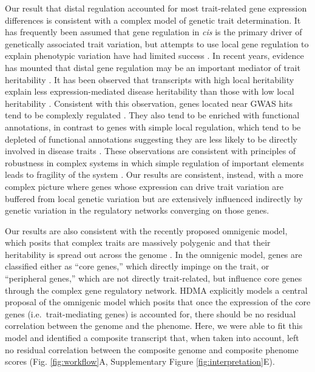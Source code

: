 \documentclass[
]{article}
\begin{document}
Our result that distal regulation accounted for most trait-related gene
expression differences is consistent with a complex model of genetic
trait determination. It has frequently been assumed that gene regulation
in \textit{cis} is the primary driver of genetically associated trait
variation, but attempts to use local gene regulation to explain
phenotypic variation have had limited success
\cite{pmid32912663, pmid36515579}. In recent years, evidence has mounted
that distal gene regulation may be an important mediator of trait
heritability \cite{pmid32424349, 
pmid37857933, pmid31051098, pmid34475573}. It has been observed that
transcripts with high local heritability explain less
expression-mediated disease heritability than those with low local
heritability \cite{pmid32424349}. Consistent with this observation,
genes located near GWAS hits tend to be complexly regulated
\cite{pmid37857933}. They also tend to be enriched with functional
annotations, in contrast to genes with simple local regulation, which
tend to be depleted of functional annotations suggesting they are less
likely to be directly involved in disease traits \cite{pmid37857933}.
These observations are consistent with principles of robustness in
complex systems in which simple regulation of important elements leads
to fragility of the system
\cite{pmid29782925, pmid12082173, pmid27304973}. Our results are
consistent, instead, with a more complex picture where genes whose
expression can drive trait variation are buffered from local genetic
variation but are extensively influenced indirectly by genetic variation
in the regulatory networks converging on those genes.

Our results are also consistent with the recently proposed omnigenic
model, which posits that complex traits are massively polygenic and that
their heritability is spread out across the genome \cite{pmid28622505}.
In the omnigenic model, genes are classified either as ``core genes,''
which directly impinge on the trait, or ``peripheral genes,'' which are
not directly trait-related, but influence core genes through the complex
gene regulatory network. HDMA explicitly models a central proposal of
the omnigenic model which posits that once the expression of the core
genes (i.e.~trait-mediating genes) is accounted for, there should be no
residual correlation between the genome and the phenome. Here, we were
able to fit this model and identified a composite transcript that, when
taken into account, left no residual correlation between the composite
genome and composite phenome scores (Fig. \ref{fig:workflow}A,
Supplementary Figure \ref{fig:interpretation}E).
\end{document}
